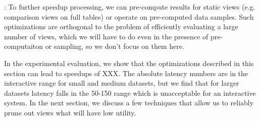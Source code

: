 
: 
To further speedup processing, we can pre-compute results for 
static views (e.g. comparison views on full tables) or operate on
pre-computed data samples.  Such optimizations are orthogonal to the
problem of efficiently evaluating a large number of views, which we will have to
do even in the presence of pre-computaiton or sampling, so we don't focus on them here.

In the experimental evaluation, we show that the optimizations described in this section can lead to speedups of XXX.
The absolute latency numbers are in the interactive range for small and medium datasets, but we find that for larger datasets latency falls in the 50-150 range which is unacceptable for an interactive system.
In the next section, we discuss a few techniques that allow us to reliably prune out  views what will have low utility. 



  
